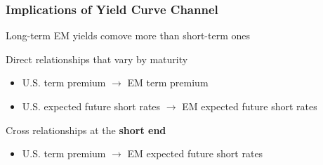 \documentclass[12pt, aspectratio=169, xcolor=dvipsnames]{beamer}
\begin{document}
\begin{frame}
\frametitle{Implications of Yield Curve Channel}

Long-term EM yields \alert{comove more} than short-term ones

\alert{Direct} relationships that vary by maturity
\begin{itemize}
\item U.S. term premium \(\rightarrow\) EM term premium
\item U.S. expected future short rates \(\rightarrow\) EM expected future short rates
\end{itemize}

\alert{Cross} relationships at the \textbf{short end}
\begin{itemize}
\item U.S. term premium \(\rightarrow\) EM expected future short rates
\end{itemize}
\end{frame}

\end{document}
